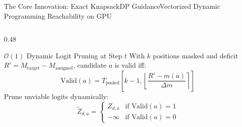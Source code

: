 \documentclass[aspectratio=169, 10pt]{beamer}
\begin{document}
\begin{frame}{The Core Innovation: Exact KnapsackDP Guidance}{Vectorized Dynamic Programming Reachability on GPU}
\begin{columns}[T]
\begin{column}{0.48\textwidth}
  \begin{exampleblock}{\scriptsize $\mathcal{O}(1)$ Dynamic Logit Pruning at Step $t$}
    \scriptsize
    With $k$ positions masked and deficit $R' = M_{\text{target}} - M_{\text{assigned}}$, candidate $a$ is valid iff:
    \begin{equation*}
      \text{Valid}(a) = T_{\text{pooled}}\left[ k-1, \left\lfloor \frac{R' - m(a)}{\Delta m} \right\rceil \right]
    \end{equation*}
    Prune unviable logits dynamically:
    \begin{equation*}
      \tilde{Z}_{d, a} = \begin{cases} Z_{d, a} & \text{if } \text{Valid}(a) = 1 \\ -\infty & \text{if } \text{Valid}(a) = 0 \end{cases}
    \end{equation*}
  \end{exampleblock}
  \vspace{0.05cm}
\end{column}
\end{columns}
\end{frame}
\end{document}
